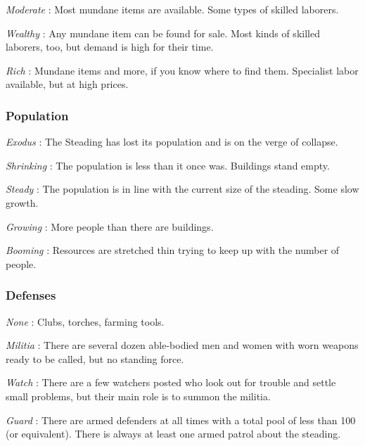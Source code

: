  

{\em Moderate} : Most mundane items are available. Some types of skilled laborers.

 

{\em Wealthy} : Any mundane item can be found for sale. Most kinds of skilled laborers, too, but demand is high for their time.

 

{\em Rich} : Mundane items and more, if you know where to find them. Specialist labor available, but at high prices.

 
\subsubsection{Population}   
 

{\em Exodus} : The Steading has lost its population and is on the verge of collapse.

 

{\em Shrinking} : The population is less than it once was. Buildings stand empty.

 

{\em Steady} : The population is in line with the current size of the steading. Some slow growth.

 

{\em Growing} : More people than there are buildings.

 

{\em Booming} : Resources are stretched thin trying to keep up with the number of people.

 
\subsubsection{Defenses}   
 

{\em None} : Clubs, torches, farming tools.

 

{\em Militia} : There are several dozen able-bodied men and women with worn weapons ready to be called, but no standing force.

 

{\em Watch} : There are a few watchers posted who look out for trouble and settle small problems, but their main role is to summon the militia.

 

{\em Guard} : There are armed defenders at all times with a total pool of less than 100 (or equivalent). There is always at least one armed patrol about the steading.


